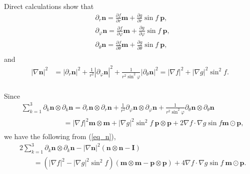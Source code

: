 \documentclass[10pt, a4paper]{article}
\newcommand\n{\mathbf{n}}
\newcommand\m{\mathbf{m}}
\newcommand\p{\mathbf{p}}
\newcommand\pp{\partial}
\begin{document}
Direct calculations show that
\begin{equation}
\begin{aligned}
& \pp_{r} \n = \frac{\partial f}{\partial r} \m +  \frac{\partial g}{\partial r} \sin f ~ \p,  \\
& \pp_{\varphi} \n = \frac{\partial f}{\partial \varphi} \m +  \frac{\partial g}{\partial \varphi} \sin f ~ \p, \\
& \pp_{\theta} \n = \frac{\partial f}{\partial \theta} \m +  \frac{\partial g}{\partial \theta} \sin f ~ \p,  \\
\end{aligned}
\end{equation}
and
\begin{equation}
\begin{aligned}
 |\nabla \n|^2 & = |\pp_r \n|^2 + \frac{1}{r^2} |\pp_{\varphi} \n|^2 + \frac{1}{r^2 \sin^2 \varphi} |\pp_{\theta} \n|^2 =  |\nabla f|^2 + |\nabla g|^2 \sin^2 f. \\
\end{aligned} 
\end{equation}

Since
\begin{equation}
\begin{aligned}
& \sum_{k = 1}^{3}\partial_k \n \otimes \partial_k \n = \pp_r \n \otimes \pp_r \n + \frac{1}{r^2} \pp_{\varphi} \n \otimes \pp_{\varphi} \n + \frac{1}{r^2 \sin^2 \varphi} \pp_{\theta} \n \otimes \pp_{\theta} \n \\
                                                 & \qquad \qquad \qquad = |\nabla f|^2 \m \otimes \m + |\nabla g|^2 \sin^2 f ~ \p \otimes \p  + 2 \nabla f \cdot \nabla g \sin f \m \odot \p, \\ 
\end{aligned}
\end{equation} 
we have the following from (\ref{eq_n}), 
\begin{equation}
\begin{aligned}
& 2 \sum_{k = 1}^{3}\partial_k \n \otimes \partial_k \n - |\nabla \n|^2 (\n \otimes \n - \mathbf{I}) \\
& \qquad = \left( |\nabla f|^2 - |\nabla g|^2 \sin^2 f \right) (\m \otimes \m - \p \otimes \p) + 4 \nabla f \cdot \nabla g \sin f ~ \m \odot \p.
\end{aligned}
\end{equation}
\end{document}
